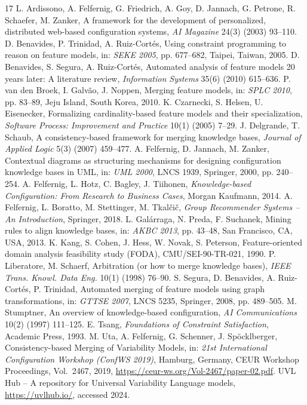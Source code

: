 \documentclass{ceurart}
\begin{document}
\newpage
\begin{thebibliography}{17}
 L. Ardissono, A. Felfernig, G. Friedrich, A. Goy, D. Jannach, G. Petrone, R. Schaefer, M. Zanker, A framework for the development of personalized, distributed web-based configuration systems, \emph{AI Magazine} 24(3) (2003) 93--110.
 D. Benavides, P. Trinidad, A. Ruiz-Cortés, Using constraint programming to reason on feature models, in: \emph{SEKE 2005}, pp. 677--682, Taipei, Taiwan, 2005.
 D. Benavides, S. Segura, A. Ruiz-Cortés, Automated analysis of feature models 20 years later: A literature review, \emph{Information Systems} 35(6) (2010) 615--636.
 P. van den Broek, I. Galvão, J. Noppen, Merging feature models, in: \emph{SPLC 2010}, pp. 83--89, Jeju Island, South Korea, 2010.
 K. Czarnecki, S. Helsen, U. Eisenecker, Formalizing cardinality-based feature models and their specialization, \emph{Software Process: Improvement and Practice} 10(1) (2005) 7--29.
 J. Delgrande, T. Schaub, A consistency-based framework for merging knowledge bases, \emph{Journal of Applied Logic} 5(3) (2007) 459--477.
 A. Felfernig, D. Jannach, M. Zanker, Contextual diagrams as structuring mechanisms for designing configuration knowledge bases in UML, in: \emph{UML 2000}, LNCS 1939, Springer, 2000, pp. 240--254.
 A. Felfernig, L. Hotz, C. Bagley, J. Tiihonen, \emph{Knowledge-based Configuration: From Research to Business Cases}, Morgan Kaufmann, 2014.
 A. Felfernig, L. Boratto, M. Stettinger, M. Tkalčič, \emph{Group Recommender Systems -- An Introduction}, Springer, 2018.
 L. Galárraga, N. Preda, F. Suchanek, Mining rules to align knowledge bases, in: \emph{AKBC 2013}, pp. 43--48, San Francisco, CA, USA, 2013.
 K. Kang, S. Cohen, J. Hess, W. Novak, S. Peterson, Feature-oriented domain analysis feasibility study (FODA), CMU/SEI-90-TR-021, 1990.
 P. Liberatore, M. Schaerf, Arbitration (or how to merge knowledge bases), \emph{IEEE Trans. Knowl. Data Eng.} 10(1) (1998) 76--90.
 S. Segura, D. Benavides, A. Ruiz-Cortés, P. Trinidad, Automated merging of feature models using graph transformations, in: \emph{GTTSE 2007}, LNCS 5235, Springer, 2008, pp. 489--505.
 M. Stumptner, An overview of knowledge-based configuration, \emph{AI Communications} 10(2) (1997) 111--125.
 E. Tsang, \emph{Foundations of Constraint Satisfaction}, Academic Press, 1993.
 M. Uta, A. Felfernig, G. Schenner, J. Sp\"ocklberger,
Consistency-based Merging of Variability Models, in: \emph{21st International Configuration Workshop (ConfWS 2019)}, Hamburg, Germany, CEUR Workshop Proceedings, Vol.~2467, 2019, \url{https://ceur-ws.org/Vol-2467/paper-02.pdf}.
 UVL Hub -- A repository for Universal Variability Language models, \url{https://uvlhub.io/}, accessed 2024.
\end{thebibliography}
\end{document}
